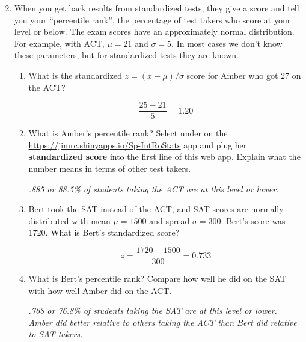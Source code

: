 \begin{enumerate}
\setcounter{enumi}{1}
  \item  When you get back results from standardized tests, they give
    a score and tell you your ``percentile rank'', the percentage
    of test takers who score at your level or below.  The exam scores have
    an approximately normal distribution.  For example, with ACT, $\mu
    = 21$ and $\sigma = 5$. In most cases we don't know these
    parameters, but for standardized tests they are known.
    \begin{enumerate}
    \item What is the standardized $z = (x-\mu)/\sigma$ score for
      Amber who got 27 on the ACT? 
\begin{students}
        \vspace{2cm}        
\end{students}
\begin{key}
  $$ \frac{25 - 21}{5} = 1.20$$
\end{key}
    \item What is Amber's percentile rank?  Select
       under  on the 
      \url{https://jimrc.shinyapps.io/Sp-IntRoStats}
      app and plug her {\bf standardized score}  into
      the first line of this web app.  Explain what
      the number means in terms of other  test takers.  
\begin{students}
        \vspace{1cm}        
\end{students}

\begin{key}
 {\it .885 or 88.5\% of students taking the ACT are at this level or lower.}
\end{key}
   \item Bert took the SAT instead of the ACT, and
      SAT scores are normally distributed with mean $\mu = 1500$
     and spread $\sigma = 300$. Bert's score was  1720. What is Bert's
     standardized score?
\begin{students}
        \vspace{2cm}        
\end{students}
\begin{key}
  $$ z = \frac{1720 - 1500}{300} = 0.733$$
\end{key}
    \item What is Bert's percentile rank? Compare how well he did on
      the SAT with how well Amber did on the ACT. 
\begin{students}
        \vspace{2cm}        
\end{students}

\begin{key}
 {\it .768 or 76.8\% of students taking the SAT are at this level
    or lower.  Amber did better relative to others taking the ACT than
    Bert did relative to SAT takers.}
\end{key} 
  \end{enumerate}
\end{enumerate}


